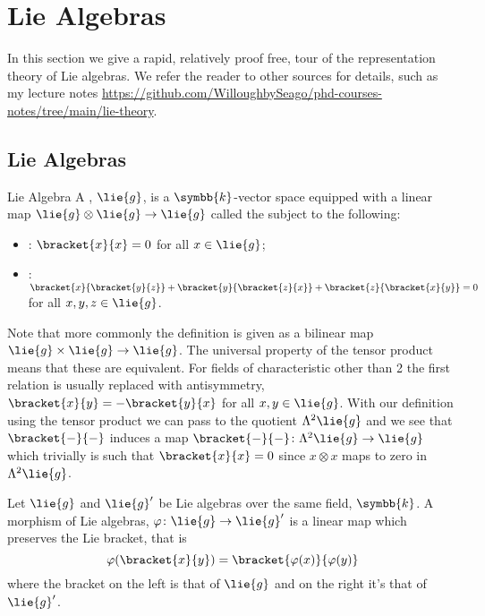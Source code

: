 \documentclass[fleqn]{NotesClass}
\renewcommand{\field}{\symbb{k}}
\begin{document}
    \chapter{Lie Algebras}
    In this section we give a rapid, relatively proof free, tour of the representation theory of Lie algebras.
    We refer the reader to other sources for details, such as my lecture notes \url{https://github.com/WilloughbySeago/phd-courses-notes/tree/main/lie-theory}.
    
    \section{Lie Algebras}
    \begin{dfn}{Lie Algebra}{}
        A , \(\lie{g}\), is a \(\field\)-vector space equipped with a linear map \(\lie{g} \otimes \lie{g} \to \lie{g}\) called the  subject to the following:
        \begin{itemize}
            \item {}: \(\bracket{x}{x} = 0\) for all \(x \in \lie{g}\);
            \item {}: \(\bracket{x}{\bracket{y}{z}} + \bracket{y}{\bracket{z}{x}} + \bracket{z}{\bracket{x}{y}} = 0\) for all \(x, y, z \in \lie{g}\).
        \end{itemize}
    \end{dfn}
    
    Note that more commonly the definition is given as a bilinear map \(\lie{g} \times \lie{g} \to \lie{g}\).
    The universal property of the tensor product means that these are equivalent.
    For fields of characteristic other than 2 the first relation is usually replaced with antisymmetry, \(\bracket{x}{y} = -\bracket{y}{x}\) for all \(x, y \in \lie{g}\).
    With our definition using the tensor product we can pass to the quotient \(\Lambda^2\lie{g}\) and we see that \(\bracket{-}{-}\) induces a map \(\bracket{-}{-} \colon \Lambda^2\lie{g} \to \lie{g}\) which trivially is such that \(\bracket{x}{x} = 0\) since \(x \otimes x\) maps to zero in \(\Lambda^2 \lie{g}\).
    
    \begin{dfn}{}{}
        Let \(\lie{g}\) and \(\lie{g}'\) be Lie algebras over the same field, \(\field\).
        A morphism of Lie algebras, \(\varphi \colon \lie{g} \to \lie{g}'\) is a linear map which preserves the Lie bracket, that is
        \begin{equation}
            \varphi(\bracket{x}{y}) = \bracket{\varphi(x)}{\varphi(y)}
        \end{equation}
        where the bracket on the left is that of \(\lie{g}\) and on the right it's that of \(\lie{g}'\).
    \end{dfn}
    
\end{document}
